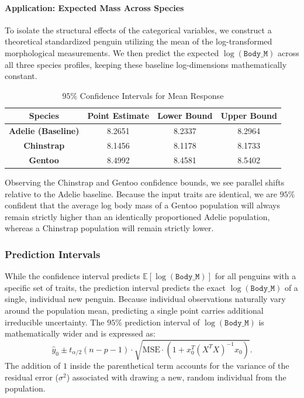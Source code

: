 \documentclass[12pt]{article}
\begin{document}
\paragraph{Application: Expected Mass Across Species}
To isolate the structural effects of the categorical
variables, we construct a theoretical standardized penguin
utilizing the mean of the log-transformed morphological
measurements. We then predict the expected $\log(\texttt{Body\_M})$
across all three species profiles, keeping these baseline
log-dimensions mathematically constant.

\begin{table}[H]
  \centering
  \begin{tabular}{|| c | c | c c ||}
    \hline
    \textbf{Species}
    & \textbf{Point Estimate}
    & \textbf{Lower Bound}
    & \textbf{Upper Bound} \\
    \hline\hline
    \textbf{Adelie (Baseline)} & 8.2651 & 8.2337 & 8.2964 \\
    \textbf{Chinstrap} & 8.1456 & 8.1178 & 8.1733 \\
    \textbf{Gentoo} & 8.4992 & 8.4581 & 8.5402 \\
    \hline
  \end{tabular}
  \caption{$95\%$ Confidence Intervals for Mean Response}
\end{table}

Observing the Chinstrap and Gentoo confidence bounds,
we see parallel shifts relative to the Adelie baseline.
Because the input traits are identical, we are $95\%$
confident that the average log body mass of a Gentoo
population will always remain strictly higher than an
identically proportioned Adelie population, whereas a
Chinstrap population will remain strictly lower.

\subsubsection{Prediction Intervals}
While the confidence interval predicts
$\mathbb{E}[\log(\texttt{Body\_M})]$
for all penguins with a specific set of traits, the
prediction interval predicts the exact
$\log(\texttt{Body\_M})$
of a
single, individual new penguin. Because individual
observations naturally vary around the population mean,
predicting a single point carries additional irreducible
uncertainty. The $95\%$ prediction interval
of $\log(\texttt{Body\_M})$ is mathematically
wider and is expressed as:
\[
  \hat{y}_0 \pm t_{\alpha/2}(n-p-1) \cdot
  \sqrt{\text{MSE} \cdot \left(1 + x_0^T
  (X^T X)^{-1} x_0\right)}
.\]
The addition of $1$ inside the parenthetical term accounts
for the variance of the residual error ($\sigma^2$)
associated with drawing a new, random individual from the
population.
\end{document}
